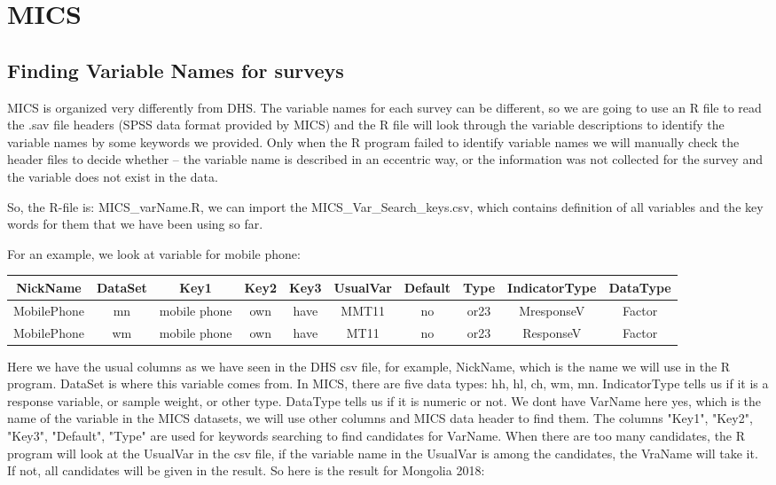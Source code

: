 \documentclass[12pt]{article}
\begin{document}
\section{MICS}
\subsection{Finding Variable Names for surveys}
MICS is organized very differently from DHS. The variable names for each survey can be different, so we are going to use an R file to read the .sav file headers (SPSS data format provided by MICS) and the R file will look through the variable descriptions to identify the variable names by some keywords we provided. Only when the R program failed to identify variable names we will manually check the header files to decide whether -- the variable name is described in an eccentric way, or the information was not collected for the survey and the variable does not exist in the data.

So, the R-file is: MICS\_varName.R, we can import the MICS\_Var\_Search\_keys.csv, which contains definition of all variables and the key words for them that we have been using so far.

For an example, we look at variable for mobile phone:

{\small 
\begin{tabular}{cccccccccc}
	NickName& DataSet& Key1 & Key2 & Key3 & UsualVar & Default & Type & IndicatorType & DataType \\
	\hline
	MobilePhone& mn& mobile phone & own & have  & MMT11 & no & or23 & MresponseV & Factor \\	
	MobilePhone& wm& mobile phone & own & have  & MT11 & no & or23 & ResponseV & Factor \\	
	
\end{tabular}
}

Here we have the usual columns as we have seen in the DHS csv file, for example, NickName, which is the name we will use in the R program. DataSet is where this variable comes from. In MICS, there are five data types: hh, hl, ch, wm, mn. IndicatorType tells us if it is a response variable, or sample weight, or other type. DataType tells us if it is numeric or not. We dont have VarName here yes, which is the name of the variable in the MICS datasets, we will use other columns and MICS data header to find them. The columns "Key1", "Key2", "Key3", "Default", "Type" are used for keywords searching to find candidates for VarName. When there are too many candidates, the R program will look at the UsualVar in the csv file, if the variable name in the UsualVar is among the candidates, the VraName will take it. If not, all candidates will be given in the result. So here is the result for Mongolia 2018:
\end{document}
